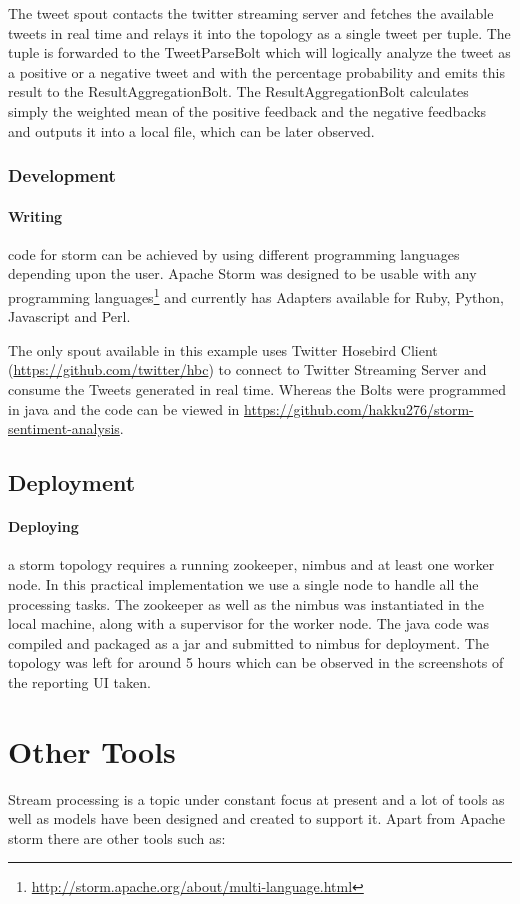 \documentclass[runningheads,a4paper]{llncs}[2015/06/24]
\begin{document}
The tweet spout contacts the twitter streaming server and fetches the available tweets in real time and relays it into the topology as a single tweet per tuple. The tuple is forwarded to the TweetParseBolt which will logically analyze the tweet as a positive or a negative tweet and with the percentage probability and emits this result to the ResultAggregationBolt. The ResultAggregationBolt calculates simply the weighted mean of the positive feedback and the negative feedbacks and outputs it into a local file, which can be later observed.

\subsubsection{Development}
\paragraph{Writing} code for storm can be achieved by using different programming languages depending upon the user. Apache Storm was designed to be usable with any programming languages\footnote{\url{http://storm.apache.org/about/multi-language.html}} and currently has Adapters available for Ruby, Python, Javascript and Perl.

The only spout available in this example uses Twitter Hosebird Client (\url{https://github.com/twitter/hbc}) to connect to Twitter Streaming Server and consume the Tweets generated in real time. Whereas the Bolts were programmed in java and the code can be viewed in \url{https://github.com/hakku276/storm-sentiment-analysis}.

\subsection{Deployment}
\paragraph{Deploying} a storm topology requires a running zookeeper, nimbus and at least one worker node. In this practical implementation we use a single node to handle all the processing tasks. The zookeeper as well as the nimbus was instantiated in the local machine, along with a supervisor for the worker node. The java code was compiled and packaged as a jar and submitted to nimbus for deployment. The topology was left for around 5 hours which can be observed in the screenshots of the reporting UI taken. 

\section{Other Tools}
 \label{sec:othertools}
 Stream processing is a topic under constant focus at present and a lot of tools as well as models have been designed and created to support it. Apart from Apache storm there are other tools such as:
 
\end{document}
